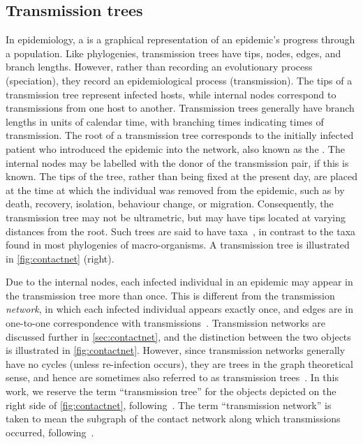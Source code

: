 \subsection{Transmission trees}

In epidemiology, a  is a graphical representation of an
epidemic's progress through a population. Like phylogenies, transmission trees
have tips, nodes, edges, and branch lengths. However, rather than recording an
evolutionary process (speciation), they record an epidemiological process
(transmission). The tips of a transmission tree represent infected hosts, while
internal nodes correspond to transmissions from one host to another.
Transmission trees generally have branch lengths in units of calendar time,
with branching times indicating times of transmission. The root of a
transmission tree corresponds to the initially infected patient who introduced
the epidemic into the network, also known as the . The
internal nodes may be labelled with the donor of the transmission pair, if this
is known. The tips of the tree, rather than being fixed at the present day, are
placed at the time at which the individual was removed from the epidemic, such
as by death, recovery, isolation, behaviour change, or migration. Consequently,
the transmission tree may not be ultrametric, but may have tips located at
varying distances from the root. Such trees are said to have
 taxa~\autocite{drummond2003measurably}, in contrast to
the  taxa found in most phylogenies of macro-organisms. A
transmission tree is illustrated in \cref{fig:contactnet} (right). 

Due to the internal nodes, each infected individual in an epidemic may appear
in the transmission tree more than once. This is different from the
transmission \emph{network}, in which each infected individual appears exactly
once, and edges are in one-to-one correspondence with
transmissions~\autocite{welch2011statistical, keeling2005networks}.
Transmission networks are discussed further in \cref{sec:contactnet}, and the
distinction between the two objects is illustrated in \cref{fig:contactnet}.
However, since transmission networks generally have no cycles (unless
re-infection occurs), they are trees in the graph theoretical sense, and hence
are sometimes also referred to as transmission
trees~\autocite[\eg][]{kenah2015algorithms}. In this work, we reserve the term
``transmission tree'' for the objects depicted on the right side of
\cref{fig:contactnet}, following~\autocite[\eg][]{stadler2013uncovering}. The
term ``transmission network'' is taken to mean the subgraph of the contact
network along which transmissions occurred,
following~\autocite{welch2011statistical, keeling2005networks}.


